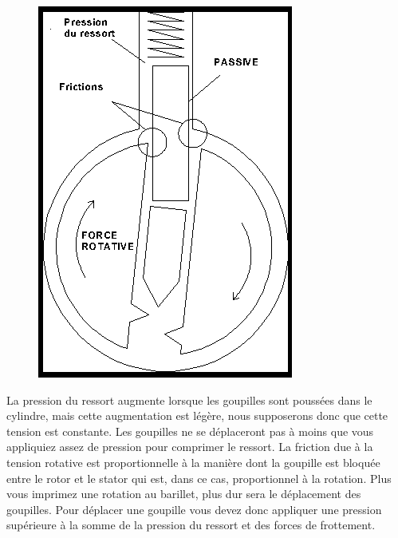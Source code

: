 \documentclass[a4paper,french,11pt,twoside]{report}
\begin{document}
\begin{figure}[h] \begin{center}
        \includegraphics[scale=0.6]{images/Image10}
        \caption{}
\end{center} \end{figure}

La pression du ressort augmente lorsque les goupilles sont poussées dans le cylindre, mais cette augmentation est légère, nous supposerons donc que cette tension est constante. Les goupilles ne se déplaceront pas à moins que vous appliquiez assez de pression pour comprimer le ressort. La friction due à la tension rotative est proportionnelle à la manière dont la goupille est bloquée entre le rotor et le stator qui est, dans ce cas, proportionnel à la rotation. Plus vous imprimez une rotation au barillet, plus dur sera le déplacement des goupilles. Pour déplacer une goupille vous devez donc appliquer une pression supérieure à la somme de la pression du ressort et des forces de frottement.
\end{document}
